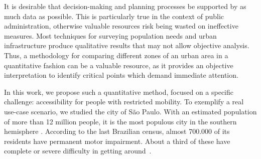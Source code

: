 \documentclass[12pt]{article}
\begin{document}

It is desirable that decision-making and planning processes be supported by as much data as possible.
This is particularly true in the context of public administration,
otherwise valuable resources risk being wasted on ineffective measures.
Most techniques for surveying population needs and urban infrastructure
produce qualitative results that may not allow objective analysis.
Thus, a methodology for comparing different zones of an urban area in a quantitative fashion can be a valuable resource,
as it provides an objective interpretation to identify critical points which demand immediate attention.

In this work, we propose such a quantitative method,
focused on a specific challenge: accessibility for people with restricted mobility.
To exemplify a real use-case scenario, we studied the city of São Paulo.
With an estimated population of more than 12 million people,
it is the most populous city in the southern hemisphere \cite{FORSTALL:2009}.
According to the last Brazilian census,
almost 700.000 of its residents have permanent motor impairment.
About a third of these have complete or severe difficulty in getting around~\cite{IBGE:2010}.
\end{document}

